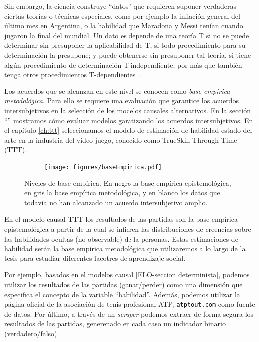 \documentclass[a4paper,10pt]{book}
\theoremstyle{definition}
\begin{document}
Sin embargo, la ciencia construye ``datos'' que requieren suponer verdaderas ciertas teorías o técnicas especiales, como por ejemplo la inflación general del último mes en Argentina, o la habilidad que Maradona y Messi tenían cuando jugaron la final del mundial.
Un dato es depende de una teoría T si no se puede determinar sin presuponer la aplicabilidad de T, si todo procedimiento para su determinación la presupone; y puede obtenerse sin presuponer tal teoría, si tiene algún procedimiento de determinación T-independiente, por más que también tenga otros procedimientos T-dependientes~\cite{lorenzano2002-concepcionEstructuralista}.

Los acuerdos que se alcanzan en este nivel se conocen como \emph{base empírica metodológica}.
Para ello se requiere una evaluación que garantice los acuerdos intersubjetivos en la selección de los modelos causales alternativos.
En la sección ``'' mostramos cómo evaluar modelos garatizando los acuerdos intersubjetivos.
En el capítulo \ref{ch:ttt} seleccionamos el modelo de estimación de habilidad estado-del-arte en la industria del video juego, conocido como TrueSkill Through Time (TTT).

\begin{figure}[H]
    \centering
    \begin{subfigure}[b]{0.48\textwidth}
    \texttt{[image: figures/baseEmpirica.pdf]}
    \end{subfigure}
    \caption{Niveles de base empírica. En negro la base empírica epistemológica, en gris la base empírica metodológica, y en blanco los datos que todavía no han alcanzado un acuerdo intersubjetivo amplio. }
\end{figure}

En el modelo causal TTT los resultados de las partidas son la base empírica epistemológica a partir de la cual se infieren las distribuciones de creencias sobre las habilidades ocultas (no observable) de la personas.
Estas estimaciones de habilidad serán la base empírica metodológica que utilizaremos a lo largo de la tesis para estudiar diferentes facotres de aprendizaje social.




Por ejemplo, basados en el modelos causal \ref{ELO-seccion determinista}, podemos utilizar los resultados de las partidas (ganar/perder) como una dimensión que especifica el concepto de la variable ``habilidad''.
Además, podemos utilizar la página oficial de la asociación de tenis profesional ATP, \texttt{atptout.com} como fuente de datos.
Por último, a través de un \emph{scraper} podemos extraer de forma segura los resultados de las partidas, generenado en cada caso un indicador binario (verdadero/falso).
\end{document}
